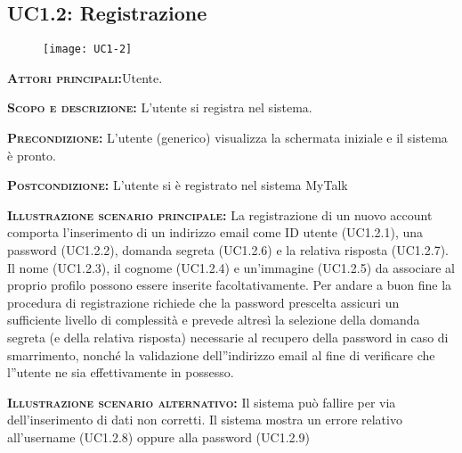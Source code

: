 \subsection{UC1.2: Registrazione}
\begin{figure}[H]
\begin{center}
\texttt{[image: UC1-2]}
\caption{}\label{fig:}
\end{center}
\end{figure}
\begin{description}
\item{\scshape\bfseries Attori principali:}Utente.
\item{\scshape\bfseries Scopo e descrizione:} L'utente si registra nel sistema.
\item{\scshape\bfseries Precondizione:} L'utente (generico) visualizza la schermata iniziale e il sistema è pronto.
\item{\scshape\bfseries Postcondizione:} L'utente si è registrato nel sistema MyTalk
\item{\scshape\bfseries Illustrazione scenario principale:} La registrazione di un nuovo account comporta l'inserimento di un indirizzo email come ID utente (UC1.2.1), una password (UC1.2.2), domanda segreta (UC1.2.6) e la relativa risposta (UC1.2.7). Il nome (UC1.2.3), il cognome (UC1.2.4) e un'immagine (UC1.2.5) da associare al proprio profilo possono essere inserite facoltativamente. Per andare a buon fine la procedura di registrazione richiede che la password prescelta assicuri un sufficiente livello di complessità e prevede altresì la selezione della domanda segreta (e della relativa risposta) necessarie al recupero della password in caso di smarrimento, nonché la validazione dell''indirizzo email al fine di verificare che l''utente ne sia effettivamente in possesso.
\item{\scshape\bfseries Illustrazione scenario alternativo:} Il sistema può fallire per via dell'inserimento di dati non corretti. Il sistema mostra un errore relativo all'username (UC1.2.8) oppure alla password (UC1.2.9)
\end{description}

